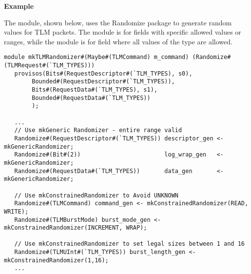 {\bf Example}

The  module, shown below,  uses the Randomize
package to generate random 
values for TLM packets.  The  module is
for fields with  specific allowed values or ranges, while the
 module is  for field where all values of the type
are allowed.

\begin{verbatim}
module mkTLMRandomizer#(Maybe#(TLMCommand) m_command) (Randomize#(TLMRequest#(`TLM_TYPES)))
   provisos(Bits#(RequestDescriptor#(`TLM_TYPES), s0),
	    Bounded#(RequestDescriptor#(`TLM_TYPES)),
	    Bits#(RequestData#(`TLM_TYPES), s1),
	    Bounded#(RequestData#(`TLM_TYPES))
	    );
      
   ...
   // Use mkGeneric Randomizer - entire range valid
   Randomize#(RequestDescriptor#(`TLM_TYPES)) descriptor_gen <- mkGenericRandomizer;
   Randomize#(Bit#(2))                        log_wrap_gen   <- mkGenericRandomizer;
   Randomize#(RequestData#(`TLM_TYPES))       data_gen       <- mkGenericRandomizer;

   // Use mkConstrainedRandomizer to Avoid UNKNOWN
   Randomize#(TLMCommand) command_gen <- mkConstrainedRandomizer(READ, WRITE);
   Randomize#(TLMBurstMode) burst_mode_gen <- mkConstrainedRandomizer(INCREMENT, WRAP); 

   // Use mkConstrainedRandomizer to set legal sizes between 1 and 16
   Randomize#(TLMUInt#(`TLM_TYPES)) burst_length_gen <- mkConstrainedRandomizer(1,16);    
   ...      
\end{verbatim}
